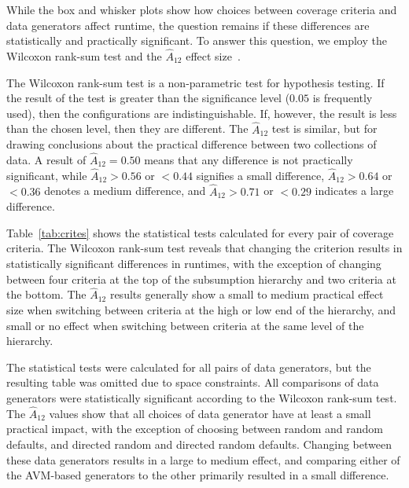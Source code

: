 
While the box and whisker plots show how choices between coverage criteria and data generators affect runtime, the
question remains if these differences are statistically and practically significant. To answer this question, we employ
the Wilcoxon rank-sum test and the $\hat{A}_{12}$ effect size~\cite{mcminn2015}.

The Wilcoxon rank-sum test is a non-parametric test for hypothesis testing.  If the result of the test is greater than
the significance level ($0.05$ is frequently used), then the configurations are indistinguishable.  If, however, the
result is less than the chosen level, then they are different.  The $\hat{A}_{12}$ test is similar, but for drawing
conclusions about the practical difference between two collections of data.  A result of $\hat{A}_{12}=0.50$ means that
any difference is not practically significant, while $\hat{A}_{12}>0.56$ or $<0.44$ signifies a small difference,
$\hat{A}_{12}>0.64$ or $<0.36$ denotes a medium difference, and $\hat{A}_{12}>0.71$ or $<0.29$ indicates a large
difference.

Table~\ref{tab:crites} shows the statistical tests calculated for every pair of coverage criteria. The Wilcoxon
rank-sum test reveals that changing the criterion results in statistically significant differences in runtimes, with the
exception of changing between four criteria at the top of the subsumption hierarchy and two criteria at the
bottom.  The $\hat{A}_{12}$ results generally show a small to medium practical effect size when switching between criteria at
the high or low end of the hierarchy, and small or no effect when switching between criteria at the same level of the
hierarchy.

The statistical tests were calculated for all pairs of data generators, but the resulting table was omitted due to space
constraints. All comparisons of data generators were statistically significant according to the Wilcoxon rank-sum test.
The $\hat{A}_{12}$ values show that all choices of data generator have at least a small practical impact, with the
exception of choosing between random and random defaults, and directed random and directed random defaults.  Changing
between these data generators results in a large to medium effect, and comparing either of the AVM-based
generators to the other primarily resulted in a small difference.
